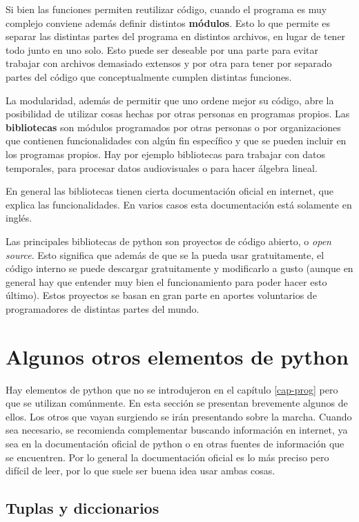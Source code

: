 \documentclass[a4paper, 12pt]{report}
\theoremstyle{definition}
\begin{document}
Si bien las funciones permiten reutilizar código, cuando el programa es muy complejo conviene además definir distintos {\bf módulos}. Esto lo que permite es separar las distintas partes del programa en distintos archivos, en lugar de tener todo junto en uno solo. Esto puede ser deseable por una parte para evitar trabajar con archivos demasiado extensos y por otra para tener por separado partes del código que conceptualmente cumplen distintas funciones.

La modularidad, además de permitir que uno ordene mejor su código, abre la posibilidad de utilizar cosas hechas por otras personas en programas propios. Las {\bf bibliotecas} son módulos programados por otras personas o por organizaciones que contienen funcionalidades con algún fin específico y que se pueden incluir en los programas propios. Hay por ejemplo bibliotecas para trabajar con datos temporales, para procesar datos audiovisuales o para hacer álgebra lineal.

En general las bibliotecas tienen cierta documentación oficial en internet, que explica las funcionalidades. En varios casos esta documentación está solamente en inglés.

Las principales bibliotecas de python son proyectos de código abierto, o {\sl open source}. Esto significa que además de que se la pueda usar gratuitamente, el código interno se puede descargar gratuitamente y modificarlo a gusto (aunque en general hay que entender muy bien el funcionamiento para poder hacer esto último). Estos proyectos se basan en gran parte en aportes voluntarios de programadores de distintas partes del mundo.

\section{Algunos otros elementos de python}

Hay elementos de python que no se introdujeron en el capítulo \ref{cap-prog} pero que se utilizan comúnmente. En esta sección se presentan brevemente algunos de ellos. Los otros que vayan surgiendo se irán presentando sobre la marcha. Cuando sea necesario, se recomienda complementar buscando información en internet, ya sea en la documentación oficial de python o en otras fuentes de información que se encuentren. Por lo general la documentación oficial es lo más preciso pero difícil de leer, por lo que suele ser buena idea usar ambas cosas.

\subsection{Tuplas y diccionarios}
\end{document}
